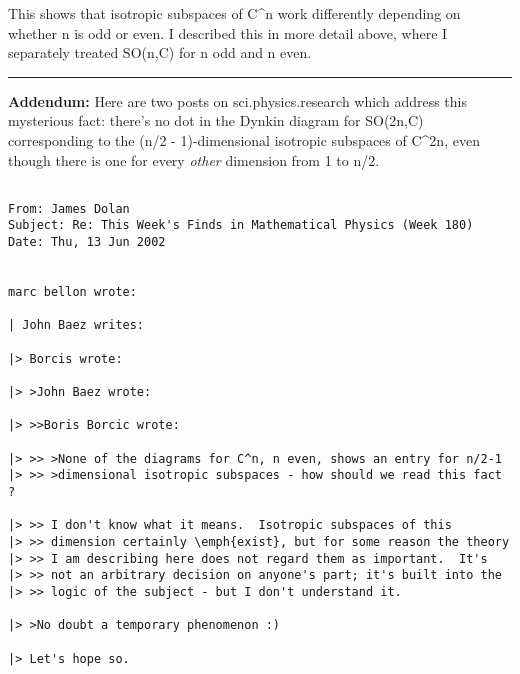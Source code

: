 This shows that isotropic subspaces of C^{n} work differently depending
on whether n is odd or even.   I described this in more detail above,
where I separately treated SO(n,C) for n odd and n even.

\par\noindent\rule{\textwidth}{0.4pt}
\textbf{Addendum:}
Here are two posts on sci.physics.research which address
this mysterious fact: there's no dot in the Dynkin diagram
for SO(2n,C) corresponding to the (n/2 - 1)-dimensional
isotropic subspaces of C^{2n}, even though there is
one for every \emph{other} dimension from 1 to n/2.

\begin{verbatim}

From: James Dolan
Subject: Re: This Week's Finds in Mathematical Physics (Week 180)
Date: Thu, 13 Jun 2002 


marc bellon wrote:

| John Baez writes:

|> Borcis wrote:

|> >John Baez wrote:
 
|> >>Boris Borcic wrote:
 
|> >> >None of the diagrams for C^n, n even, shows an entry for n/2-1 
|> >> >dimensional isotropic subspaces - how should we read this fact ?
 
|> >> I don't know what it means.  Isotropic subspaces of this
|> >> dimension certainly \emph{exist}, but for some reason the theory
|> >> I am describing here does not regard them as important.  It's
|> >> not an arbitrary decision on anyone's part; it's built into the 
|> >> logic of the subject - but I don't understand it.
 
|> >No doubt a temporary phenomenon :)

|> Let's hope so.  


\end{verbatim}
